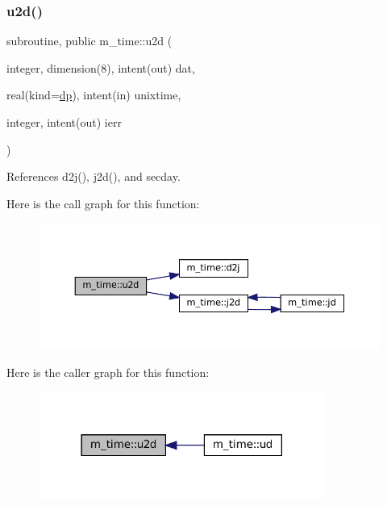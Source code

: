 \subsubsection{\texorpdfstring{u2d()}{u2d()}}
{\footnotesize\ttfamily subroutine, public m\+\_\+time\+::u2d (\begin{DoxyParamCaption}\item[{integer, dimension(8), intent(out)}]{dat,  }\item[{real(kind=\mbox{\hyperlink{namespacem__time_a95f16e7435244d114f0a451625dc189a}{dp}}), intent(in)}]{unixtime,  }\item[{integer, intent(out)}]{ierr }\end{DoxyParamCaption})}



References d2j(), j2d(), and secday.

Here is the call graph for this function\+:\nopagebreak
\begin{figure}[H]
\begin{center}
\leavevmode
\includegraphics[width=350pt]{namespacem__time_a6c01c810eb2acce767d2f24b9aaefa56_cgraph}
\end{center}
\end{figure}
Here is the caller graph for this function\+:\nopagebreak
\begin{figure}[H]
\begin{center}
\leavevmode
\includegraphics[width=266pt]{namespacem__time_a6c01c810eb2acce767d2f24b9aaefa56_icgraph}
\end{center}
\end{figure}
\mbox{\label{namespacem__time_a8b2c0ede467ef5185d478a072a9f969f}} 
